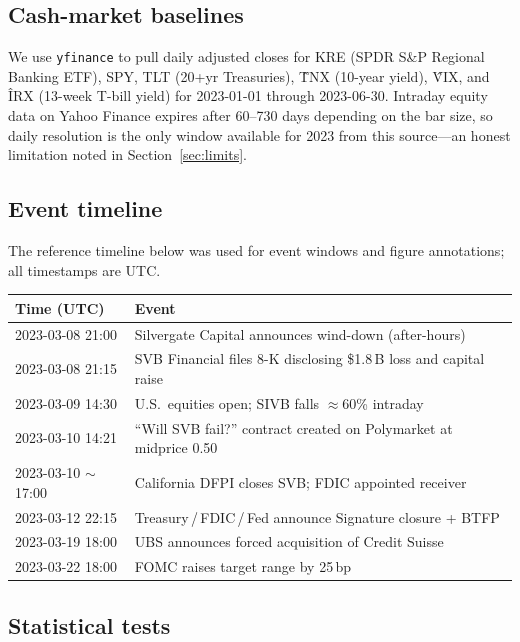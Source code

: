 \documentclass{article}
\begin{document}
\subsection{Cash-market baselines}

We use \texttt{yfinance} to pull daily adjusted closes for
KRE (SPDR S\&P Regional Banking ETF), SPY, TLT (20+yr Treasuries), \^TNX
(10-year yield), \^VIX, and \^IRX (13-week T-bill yield) for
2023-01-01 through 2023-06-30.  Intraday equity data on Yahoo Finance
expires after 60--730 days depending on the bar size, so daily resolution
is the only window available for 2023 from this source---an honest
limitation noted in Section~\ref{sec:limits}.

\subsection{Event timeline}

The reference timeline below was used for event windows and figure
annotations; all timestamps are UTC.

\begin{center}\small
\begin{tabular}{ll}
\toprule
\textbf{Time (UTC)} & \textbf{Event} \\
\midrule
2023-03-08 21:00 & Silvergate Capital announces wind-down (after-hours) \\
2023-03-08 21:15 & SVB Financial files 8-K disclosing \$1.8\,B loss and capital raise \\
2023-03-09 14:30 & U.S.\ equities open; SIVB falls $\approx$60\% intraday \\
2023-03-10 14:21 & ``Will SVB fail?'' contract created on Polymarket at midprice 0.50 \\
2023-03-10 $\sim$17:00 & California DFPI closes SVB; FDIC appointed receiver \\
2023-03-12 22:15 & Treasury\,/\,FDIC\,/\,Fed announce Signature closure + BTFP \\
2023-03-19 18:00 & UBS announces forced acquisition of Credit Suisse \\
2023-03-22 18:00 & FOMC raises target range by 25\,bp \\
\bottomrule
\end{tabular}
\end{center}

\subsection{Statistical tests}
\label{sec:stat}
\end{document}
